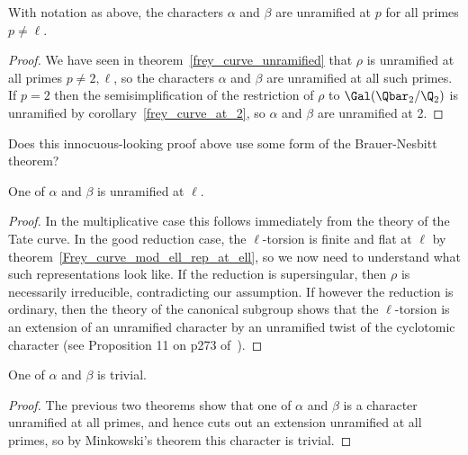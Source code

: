 \begin{theorem}\label{Frey_characters_are_unramified}\notready With notation as above, the characters
  $\alpha$ and $\beta$ are unramified at $p$ for all primes $p\not=\ell$.
\end{theorem}
\begin{proof} We have seen in theorem~\ref{frey_curve_unramified} that $\rho$ is unramified at all
  primes $p\not=2,\ell$, so the
  characters $\alpha$ and $\beta$ are unramified at all such primes. If $p=2$ then the
  semisimplification of the restriction of $\rho$ to $\Gal(\Qbar_2/\Q_2)$ is unramified
  by corollary~\ref{frey_curve_at_2}, so $\alpha$ and $\beta$ are unramified at 2.
\end{proof}

\begin{remark} Does this innocuous-looking proof above use some form of the Brauer-Nesbitt theorem?
\end{remark}

\begin{theorem}\label{Frey_characters_at_ell}\notready One of $\alpha$ and $\beta$ is unramified at $\ell$.
\end{theorem}
\begin{proof}
In the multiplicative case this follows immediately from the theory of the Tate curve.
In the good reduction case, the $\ell$-torsion is finite and flat at $\ell$ by theorem~\ref{Frey_curve_mod_ell_rep_at_ell}, so we now need to understand what such representations
look like. If the reduction is supersingular, then $\rho$ is necessarily irreducible,
contradicting our assumption. If however the reduction is ordinary, then the theory of the
canonical subgroup shows that the $\ell$-torsion is an extension of an unramified character by
an unramified twist of the cyclotomic character (see Proposition 11 on p273 of~\cite{serrepropgal}).
\end{proof}

\begin{corollary}\label{Frey_characters_trivial} One of $\alpha$ and $\beta$ is trivial.
\end{corollary}
\begin{proof}
The previous two theorems show that one of $\alpha$ and $\beta$ is a character unramified at all
primes, and hence cuts out an extension unramified at all primes, so by Minkowski's theorem this character
is trivial.
\end{proof}

